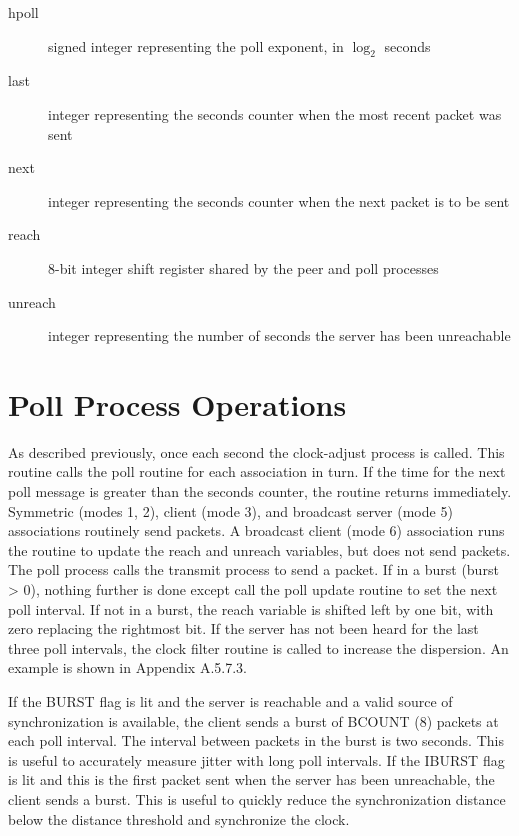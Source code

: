 \begin{description}

  \item[hpoll] signed integer representing the poll exponent, in $ \log_2 $ seconds

  \item[last] integer representing the seconds counter when the most recent
    packet was sent

  \item[next] integer representing the seconds counter when the next packet
    is to be sent

  \item[reach] 8-bit integer shift register shared by the peer and poll
    processes

  \item[unreach] integer representing the number of seconds the server has
    been unreachable

\end{description}

\section{Poll Process Operations}

As described previously, once each second the clock-adjust process is
called.  This routine calls the poll routine for each association in
turn.  If the time for the next poll message is greater than the
seconds counter, the routine returns immediately.  Symmetric (modes
1, 2), client (mode 3), and broadcast server (mode 5) associations
routinely send packets.  A broadcast client (mode 6) association runs
the routine to update the reach and unreach variables, but does not
send packets.  The poll process calls the transmit process to send a
packet.  If in a burst (burst > 0), nothing further is done except
call the poll update routine to set the next poll interval.
  If not in a burst, the reach variable is shifted left by one bit,
with zero replacing the rightmost bit.  If the server has not been
heard for the last three poll intervals, the clock filter routine is
called to increase the dispersion.  An example is shown in
Appendix A.5.7.3.

If the BURST flag is lit and the server is reachable and a valid
source of synchronization is available, the client sends a burst of
BCOUNT (8) packets at each poll interval.  The interval between
packets in the burst is two seconds.  This is useful to accurately
measure jitter with long poll intervals.  If the IBURST flag is lit
and this is the first packet sent when the server has been
unreachable, the client sends a burst.  This is useful to quickly
reduce the synchronization distance below the distance threshold and
synchronize the clock.

